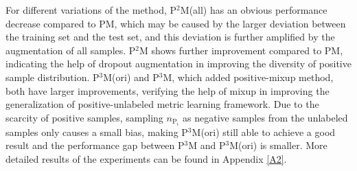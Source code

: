 \documentclass[11pt]{article}
\begin{document}
For different variations of the method, P$^2$M(all) has an obvious performance decrease compared to PM, which may be caused by the larger deviation between the training set and the test set, and this deviation is further amplified by the augmentation of all samples. P$^2$M shows further improvement compared to PM, indicating the help of dropout augmentation in improving the diversity of positive sample distribution. P$^3$M(ori) and P$^3$M, which added positive-mixup method, both have larger improvements, verifying the help of mixup in improving the generalization of positive-unlabeled metric learning framework. Due to the scarcity of positive samples, sampling $n_{\mathrm{P}_{i}}$ as negative samples from the unlabeled samples only causes a small bias, making P$^3$M(ori) still able to achieve a good result and the performance gap between P$^3$M and P$^3$M(ori) is smaller. More detailed results of the experiments can be found in Appendix \ref{A2}.

\end{document}
